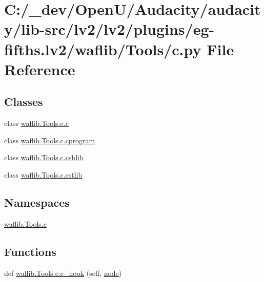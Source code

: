 \hypertarget{lv2_2plugins_2eg-fifths_8lv2_2waflib_2_tools_2c_8py}{}\section{C\+:/\+\_\+dev/\+Open\+U/\+Audacity/audacity/lib-\/src/lv2/lv2/plugins/eg-\/fifths.lv2/waflib/\+Tools/c.py File Reference}
\label{lv2_2plugins_2eg-fifths_8lv2_2waflib_2_tools_2c_8py}
\subsection*{Classes}
\begin{DoxyCompactItemize}
\item 
class \hyperlink{classwaflib_1_1_tools_1_1c_1_1c}{waflib.\+Tools.\+c.\+c}
\item 
class \hyperlink{classwaflib_1_1_tools_1_1c_1_1cprogram}{waflib.\+Tools.\+c.\+cprogram}
\item 
class \hyperlink{classwaflib_1_1_tools_1_1c_1_1cshlib}{waflib.\+Tools.\+c.\+cshlib}
\item 
class \hyperlink{classwaflib_1_1_tools_1_1c_1_1cstlib}{waflib.\+Tools.\+c.\+cstlib}
\end{DoxyCompactItemize}
\subsection*{Namespaces}
\begin{DoxyCompactItemize}
\item 
 \hyperlink{namespacewaflib_1_1_tools_1_1c}{waflib.\+Tools.\+c}
\end{DoxyCompactItemize}
\subsection*{Functions}
\begin{DoxyCompactItemize}
\item 
def \hyperlink{namespacewaflib_1_1_tools_1_1c_a133cda6439588809c5d3ccdc6bf3c5d1}{waflib.\+Tools.\+c.\+c\+\_\+hook} (self, \hyperlink{structnode}{node})
\end{DoxyCompactItemize}
